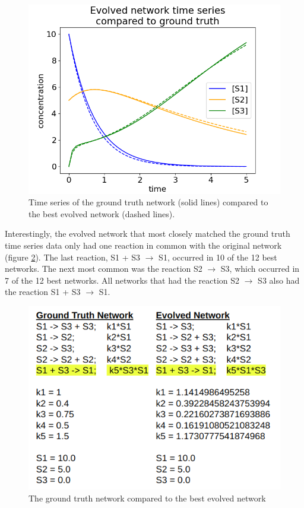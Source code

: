 \documentclass[12pt]{report}
\begin{document}
\begin{figure}
\centering
    \includegraphics[width=15cm]{images/ground_truth_vs_evolved.png}
    \caption[Time series of the ground truth network compared to the best evolved network]{Time series of the ground truth network (solid lines) compared to the best evolved network (dashed lines).}
    \label{fig:truth_vs_evolved}
\end{figure}

Interestingly, the evolved network that most closely matched the ground truth time series data only had one reaction in common with the original network (figure \ref{fig:evolved_network_structure}). The last reaction, S1 + S3 $\to$ S1, occurred in 10 of the 12 best networks. The next most common was the reaction S2 $\to$ S3, which occurred in 7 of the 12 best networks. All networks that had the reaction S2 $\to$ S3 also had the reaction S1 + S3 $\to$ S1.

\begin{figure}
\centering
    \includegraphics[width=15cm]{images/antimony_truth_evolved.png}
    \caption[The ground truth network compared to the best evolved network]{The ground truth network compared to the best evolved network}
    \label{fig:evolved_network_structure}
\end{figure}
\end{document}
